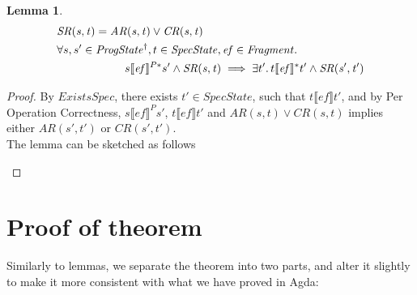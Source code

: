 \documentclass[letterpaper,twocolumn,10pt]{article}
\newtheorem{lemma}[theorem]{Lemma}
\theoremstyle{definition}
\renewcommand{\i}[1]{\ensuremath{\mathit{#1}}}
\begin{document}
\begin{lemma}\label{lemma-1}
	\begin{align*}
		&\i{SR(s, t)} = \i{AR(s, t)} \lor \i{CR(s, t)}\\
		&\forall s, s' \in \i{ProgState^\dagger}, t \in \i{SpecState}, \i{ef} \in \i{Fragment} \ldotp\\
		&\qquad \qquad \qquad s \llbracket \i{ef} \rrbracket^{P*} s'  \land \i{SR(s, t)} \implies \exists t' \ldotp t\llbracket \i{ef} \rrbracket^* t' \land \i{SR(s', t')} \\
	\end{align*}
\end{lemma}
\begin{proof}
	By $\i{ExistsSpec}$, there exists $t' \in SpecState$, such that $t \llbracket \i{ef} \rrbracket t'$, and by Per Operation Correctness, $s \llbracket \i{ef} \rrbracket^P s'$, $t \llbracket \i{ef} \rrbracket t'$ and $\i{AR(s, t)} \lor \i{CR(s, t)}$ implies either $\i{AR(s', t')}$ or $\i{CR(s', t')}$. \\
	The lemma can be sketched as follows
	\begin{figure} [h] \centering
{}
	\end{figure}
\end{proof}

\section{Proof of theorem}

Similarly to lemmas, we separate the theorem into two parts, and alter it slightly to make it more consistent with what we have proved in Agda:
\end{document}

